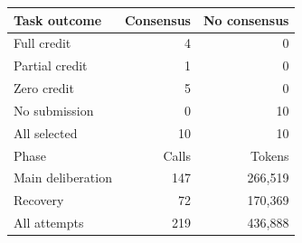 \begin{tabular}{@{}lrr@{}}
\toprule
Task outcome & Consensus & No consensus \\
\midrule
Full credit & 4 & 0 \\
Partial credit & 1 & 0 \\
Zero credit & 5 & 0 \\
No submission & 0 & 10 \\
All selected & 10 & 10 \\
\midrule
Phase & Calls & Tokens \\
\midrule
Main deliberation & 147 & 266,519 \\
Recovery & 72 & 170,369 \\
All attempts & 219 & 436,888 \\
\bottomrule
\end{tabular}
